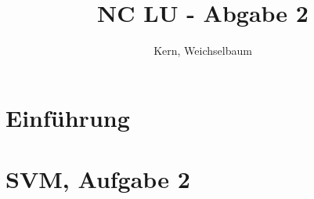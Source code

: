 \documentclass[12pt]{article}
\title{NC LU - Abgabe 2}
\author{Kern, Weichselbaum}
\begin{document}
	
	
\maketitle	

\section{Einführung}


\section{SVM, Aufgabe 2}
\end{document}
